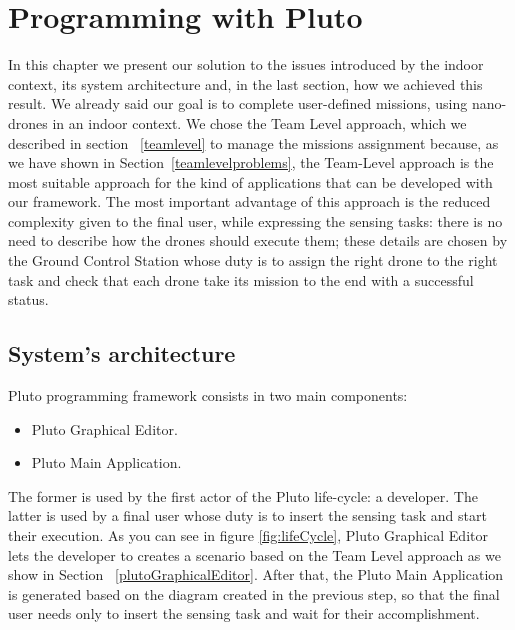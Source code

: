 \chapter{Programming with Pluto}
\label{cap4}

In this chapter we present our solution to the issues introduced by the indoor context, its system architecture and, in the last section, how we achieved this result. We already said our goal is to complete user-defined missions, using nano-drones in an indoor context. We chose the Team Level approach, which we described in section ~\ref{teamlevel} to manage the missions assignment because, as we have shown in Section~\ref{teamlevelproblems}, the Team-Level approach is the most suitable approach for the kind of applications that can be developed with our framework.
The most important advantage of this approach is the reduced complexity given to the final user, while expressing the sensing tasks: there is no need to describe how the drones should execute them; these details are chosen by the Ground Control Station whose duty is to assign the right drone to the right task and check that each drone take its mission to the end with a successful status.


\section{System's architecture}\label{architecture}
Pluto programming framework consists in two main components:
\begin{itemize}
\item Pluto Graphical Editor.
\item Pluto Main Application.
\end{itemize}
The former is used by the first actor of the Pluto life-cycle: a developer. The latter is used by a final user whose duty is to insert the sensing task and start their execution.
As you can see in figure \ref{fig:lifeCycle}, Pluto Graphical Editor lets the developer to creates a scenario based on the Team Level approach as we show in Section ~\ref{plutoGraphicalEditor}. After that, the Pluto Main Application is generated based on the diagram created in the previous step, so that the final user needs only to insert the sensing task and wait for their accomplishment.

